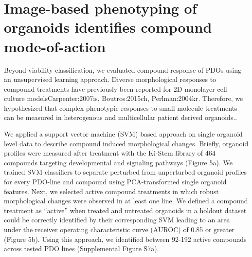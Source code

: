 \section{Image-based phenotyping of organoids identifies compound mode-of-action}

Beyond viability classification, we evaluated compound response of PDOs using an unsupervised learning  approach. Diverse morphological responses to compound treatments have previously been reported for 2D monolayer cell culture models{Carpenter:2007is, Boutros:2015ch, Perlman:2004kr}. Therefore, we hypothesized that complex phenotypic responses to small molecule treatments can be measured in heterogenous and multicellular patient derived organoids..

We applied a support vector machine (SVM) based approach on single organoid level data to describe compound induced morphological changes. Briefly, organoid profiles were measured after treatment with the Ki-Stem library of 464 compounds targeting developmental and signaling pathways (Figure 5a). We trained SVM classifiers to separate perturbed from unperturbed organoid profiles for every PDO-line and compound using PCA-transformed single organoid features. Next, we selected active compound treatments in which robust morphological changes were observed in at least one line. We defined a compound treatment as “active” when treated and untreated organoids in a holdout dataset could be correctly identified by their corresponding SVM leading to an area under the receiver operating characteristic curve (AUROC) of 0.85 or greater (Figure 5b). Using this approach, we identified between 92-192 active compounds across tested PDO lines (Supplemental Figure S7a).
